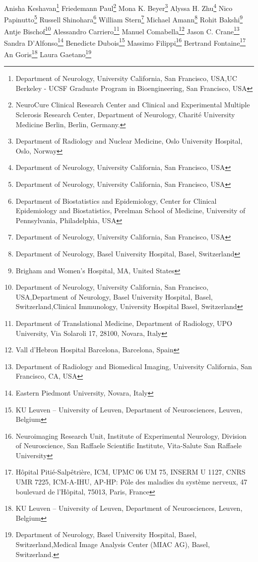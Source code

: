 \iflatexml
Anisha Keshavan\footnote[1,2]{Department of Neurology, University California, San Francisco,  USA,UC Berkeley - UCSF Graduate Program in Bioengineering, San Francisco, USA}
Friedemann Paul\footnote[3]{NeuroCure Clinical Research Center and Clinical and Experimental Multiple Sclerosis Research Center, Department of Neurology, Charité University Medicine Berlin, Berlin, Germany.}
Mona K. Beyer\footnote[4]{Department of Radiology and Nuclear Medicine, Oslo University Hospital, Oslo, Norway}
Alyssa H. Zhu\footnote[1]{Department of Neurology, University California, San Francisco,  USA}
Nico Papinutto\footnote[1]{Department of Neurology, University California, San Francisco,  USA}
Russell Shinohara\footnote[5]{Department of Biostatistics and Epidemiology, Center for Clinical Epidemiology and Biostatistics, Perelman School of Medicine, University of Pennsylvania, Philadelphia, USA}
William Stern\footnote[1]{Department of Neurology, University California, San Francisco,  USA}
Michael Amann\footnote[6]{Department of Neurology, Basel University Hospital, Basel, Switzerland}
Rohit Bakshi\footnote[7]{Brigham and Women's Hospital, MA, United States}
Antje Bischof\footnote[1,6,8]{Department of Neurology, University California, San Francisco,  USA,Department of Neurology, Basel University Hospital, Basel, Switzerland,Clinical Immunology, University Hospital Basel, Switzerland}
Alessandro Carriero\footnote[9]{Department of Translational Medicine, Department of Radiology,  UPO University, Via Solaroli 17, 28100, Novara, Italy}
Manuel Comabella\footnote[10]{Vall d’Hebron Hospital Barcelona, Barcelona, Spain}
Jason C. Crane\footnote[11]{Department of Radiology and Biomedical Imaging, University California, San Francisco, CA, USA}
Sandra D’Alfonso\footnote[12]{Eastern Piedmont University, Novara, Italy}
Benedicte Dubois\footnote[13]{ KU Leuven – University of Leuven, Department of Neurosciences, Leuven, Belgium}
Massimo Filippi\footnote[14]{Neuroimaging Research Unit, Institute of Experimental Neurology, Division of Neuroscience, San Raffaele Scientific Institute, Vita-Salute San Raffaele University}
Bertrand Fontaine\footnote[15]{Hôpital Pitié-Salpêtrière, ICM, UPMC 06 UM 75, INSERM U 1127, CNRS UMR 7225, ICM-A-IHU, AP-HP: Pôle des maladies du système nerveux, 47 boulevard de l'Hôpital, 75013, Paris, France}
An Goris\footnote[13]{ KU Leuven – University of Leuven, Department of Neurosciences, Leuven, Belgium}
Laura Gaetano\footnote[6,16]{Department of Neurology, Basel University Hospital, Basel, Switzerland,Medical Image Analysis Center (MIAC AG), Basel, Switzerland.}
